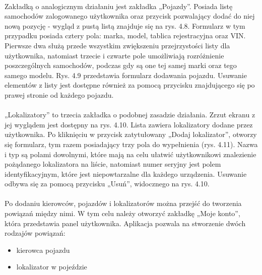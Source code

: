 \paragraph{}
Zakładką o analogicznym działaniu jest zakładka „Pojazdy”. Posiada listę samochodów zalogowanego użytkownika oraz przycisk pozwalający dodać do niej nową pozycję - wygląd z pustą listą znajduje się na rys. 4.8. Formularz w tym przypadku posiada cztery pola: marka, model, tablica rejestracyjna oraz VIN. Pierwsze dwa służą przede wszystkim zwiększeniu przejrzystości listy dla użytkownika, natomiast trzecie i czwarte pole umożliwiają rozróżnienie poszczególnych samochodów, podczas gdy są one tej samej marki oraz tego samego modelu. Rys. 4.9 przedstawia formularz dodawania pojazdu. Usuwanie elementów z listy jest dostępne również za pomocą przycisku znajdującego się po prawej stronie od każdego pojazdu.

\paragraph{}
„Lokalizatory” to trzecia zakładka o podobnej zasadzie działania. Zrzut ekranu z jej wyglądem jest dostępny na rys. 4.10. Lista zawiera lokalizatory dodane przez użytkownika. Po kliknięciu w przycisk zatytułowany „Dodaj lokalizator”, otworzy się formularz, tym razem posiadający trzy pola do wypełnienia (rys. 4.11). Nazwa i typ są polami dowolnymi, które mają na celu ułatwić użytkownikowi znalezienie pożądanego lokalizatora na liście, natomiast numer seryjny jest polem identyfikacyjnym, które jest niepowtarzalne dla każdego urządzenia. Usuwanie odbywa się za pomocą przycisku „Usuń”, widocznego na rys. 4.10.

\paragraph{}
Po dodaniu kierowców, pojazdów i lokalizatorów można przejść do tworzenia powiązań między nimi. W tym celu należy otworzyć zakładkę „Moje konto”, która przedstawia panel użytkownika. Aplikacja pozwala na stworzenie dwóch rodzajów powiązań:

\begin{itemize}
	\item kierowca pojazdu
	\item lokalizator w pojeździe
\end{itemize}

